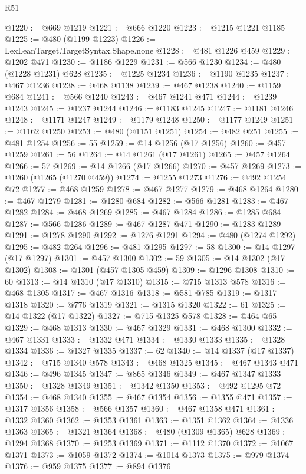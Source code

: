 \begin{lexlean}{R51}
\begin{coremodule}
@1220 := @669 @1219
@1221 := @666 @1220
@1223 := @1215 @1221 @1185
@1225 := @480 (@1199 @1223)
@1226 := LexLeanTarget.TargetSyntax.Shape.none
@1228 := @481 @1226 @459
@1229 := @1202 @471
@1230 := @1186 @1229
@1231 := @566 @1230
@1234 := @480 (@1228 @1231) @628
@1235 := @1225 @1234
@1236 := @1190 @1235
@1237 := @467 @1236
@1238 := @468 @1138
@1239 := @467 @1238
@1240 := @1159 @684
@1241 := @566 @1240
@1243 := @467 @1241 @471
@1244 := @1239 @1243
@1245 := @1237 @1244
@1246 := @1183 @1245
@1247 := @1181 @1246
@1248 := @1171 @1247
@1249 := @1179 @1248
@1250 := @1177 @1249
@1251 := @1162 @1250
@1253 := @480 (@1151 @1251)
@1254 := @482 @251
@1255 := @481 @1254
@1256 := 55
@1259 := @14 @1256 (@17 @1256)
@1260 := @457 @1259
@1261 := 56
@1264 := @14 @1261 (@17 @1261)
@1265 := @457 @1264
@1266 := 57
@1269 := @14 @1266 (@17 @1266)
@1270 := @457 @1269
@1273 := @1260 (@1265 (@1270 @459))
@1274 := @1255 @1273
@1276 := @492 @1254 @72
@1277 := @468 @1259
@1278 := @467 @1277
@1279 := @468 @1264
@1280 := @467 @1279
@1281 := @1280 @684
@1282 := @566 @1281
@1283 := @467 @1282
@1284 := @468 @1269
@1285 := @467 @1284
@1286 := @1285 @684
@1287 := @566 @1286
@1289 := @467 @1287 @471
@1290 := @1283 @1289
@1291 := @1278 @1290
@1292 := @1276 @1291
@1294 := @480 (@1274 @1292)
@1295 := @482 @264
@1296 := @481 @1295
@1297 := 58
@1300 := @14 @1297 (@17 @1297)
@1301 := @457 @1300
@1302 := 59
@1305 := @14 @1302 (@17 @1302)
@1308 := @1301 (@457 @1305 @459)
@1309 := @1296 @1308
@1310 := 60
@1313 := @14 @1310 (@17 @1310)
@1315 := @715 @1313 @578
@1316 := @468 @1305
@1317 := @467 @1316
@1318 := @581 @785
@1319 := @1317 @1318
@1320 := @776 @1319
@1321 := @1315 @1320
@1322 := 61
@1325 := @14 @1322 (@17 @1322)
@1327 := @715 @1325 @578
@1328 := @464 @65
@1329 := @468 @1313
@1330 := @467 @1329
@1331 := @468 @1300
@1332 := @467 @1331
@1333 := @1332 @471
@1334 := @1330 @1333
@1335 := @1328 @1334
@1336 := @1327 @1335
@1337 := 62
@1340 := @14 @1337 (@17 @1337)
@1342 := @715 @1340 @578
@1343 := @468 @1325
@1345 := @467 @1343 @471
@1346 := @496 @1345
@1347 := @865 @1346
@1349 := @467 @1347 @1333
@1350 := @1328 @1349
@1351 := @1342 @1350
@1353 := @492 @1295 @72
@1354 := @468 @1340
@1355 := @467 @1354
@1356 := @1355 @471
@1357 := @1317 @1356
@1358 := @566 @1357
@1360 := @467 @1358 @471
@1361 := @1332 @1360
@1362 := @1353 @1361
@1363 := @1351 @1362
@1364 := @1336 @1363
@1365 := @1321 @1364
@1368 := @480 (@1309 @1365) @628
@1369 := @1294 @1368
@1370 := @1253 @1369
@1371 := @1112 @1370
@1372 := @1067 @1371
@1373 := @1059 @1372
@1374 := @1014 @1373
@1375 := @979 @1374
@1376 := @959 @1375
@1377 := @894 @1376

\end{coremodule}
\end{lexlean}
